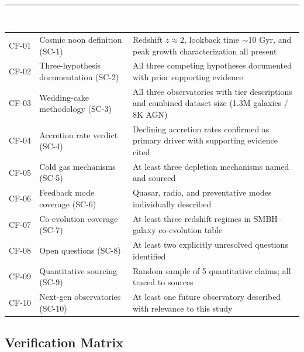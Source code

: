 \documentclass[11pt,letterpaper]{article}
\newcommand{\tableheader}[1]{\textbf{\sffamily\textcolor{white}{#1}}}
\begin{document}
\begin{center}
\begin{tabularx}{\textwidth}{C{1.5cm}L{4.5cm}X}
\toprule
{}
\tableheader{Test ID} & \tableheader{Verifies} & \tableheader{Expected Behavior} \\
\midrule
CF-01 & Cosmic noon definition (SC-1) & Redshift $z \approx 2$, lookback time $\sim$10 Gyr, and peak growth characterization all present \\
CF-02 & Three-hypothesis documentation (SC-2) & All three competing hypotheses documented with prior supporting evidence \\
CF-03 & Wedding-cake methodology (SC-3) & All three observatories with tier descriptions and combined dataset size (1.3M galaxies / 8K AGN) \\
CF-04 & Accretion rate verdict (SC-4) & Declining accretion rates confirmed as primary driver with supporting evidence cited \\
CF-05 & Cold gas mechanisms (SC-5) & At least three depletion mechanisms named and sourced \\
CF-06 & Feedback mode coverage (SC-6) & Quasar, radio, and preventative modes individually described \\
CF-07 & Co-evolution coverage (SC-7) & At least three redshift regimes in SMBH--galaxy co-evolution table \\
CF-08 & Open questions (SC-8) & At least two explicitly unresolved questions identified \\
CF-09 & Quantitative sourcing (SC-9) & Random sample of 5 quantitative claims; all traced to sources \\
CF-10 & Next-gen observatories (SC-10) & At least one future observatory described with relevance to this study \\
\bottomrule
\end{tabularx}
\end{center}

\subsection{Verification Matrix}
\end{document}

